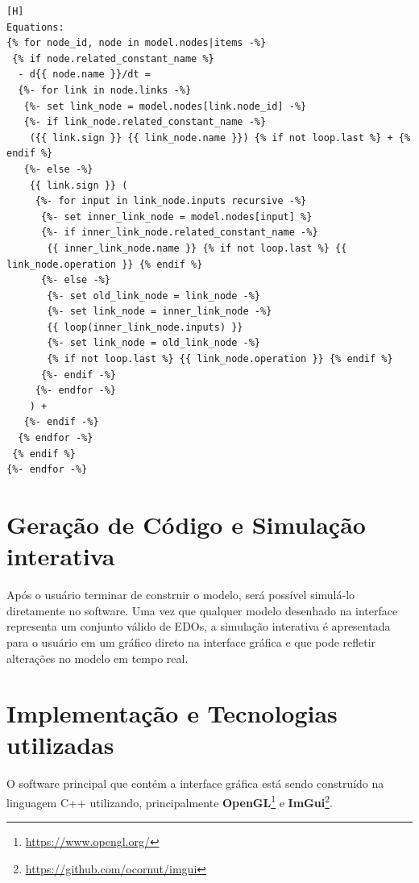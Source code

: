 \documentclass[
	12pt,				%
	openright,			%
	oneside,			%
	a4paper,			%
	main=brazil,
	english,			%
	]{ufsj-abntex2}
\begin{document}
\begin{lstlisting}[language=jinja2, label={code::equation-template-jinja}][H]
Equations:
{% for node_id, node in model.nodes|items -%}
 {% if node.related_constant_name %}
  - d{{ node.name }}/dt =
  {%- for link in node.links -%}
   {%- set link_node = model.nodes[link.node_id] -%}
   {%- if link_node.related_constant_name -%}
    ({{ link.sign }} {{ link_node.name }}) {% if not loop.last %} + {% endif %}
   {%- else -%}
    {{ link.sign }} (
     {%- for input in link_node.inputs recursive -%}
      {%- set inner_link_node = model.nodes[input] %}
      {%- if inner_link_node.related_constant_name -%}
       {{ inner_link_node.name }} {% if not loop.last %} {{ link_node.operation }} {% endif %}
      {%- else -%}
       {%- set old_link_node = link_node -%}
       {%- set link_node = inner_link_node -%}
       {{ loop(inner_link_node.inputs) }}
       {%- set link_node = old_link_node -%}
       {% if not loop.last %} {{ link_node.operation }} {% endif %}
      {%- endif -%}
     {%- endfor -%}
    ) +
   {%- endif -%}
  {% endfor -%}
 {% endif %}
{%- endfor -%}
\end{lstlisting}

\section{Geração de Código e Simulação interativa}

Após o usuário terminar de construir o modelo, será possível simulá-lo diretamente no software. Uma vez que qualquer modelo desenhado na interface representa um conjunto válido de EDOs, a simulação interativa é apresentada para o usuário em um gráfico direto na interface gráfica e que pode refletir alterações no modelo em tempo real. 

\section{Implementação e Tecnologias utilizadas}
\label{sec:tecnologias}


O software principal que contém a interface gráfica está sendo construído na linguagem C++ utilizando, principalmente \textbf{OpenGL}\footnote{\href{https://www.opengl.org/}{https://www.opengl.org/}} e \textbf{ImGui}\footnote{\href{https://github.com/ocornut/imgui}{https://github.com/ocornut/imgui}}.
\end{document}
